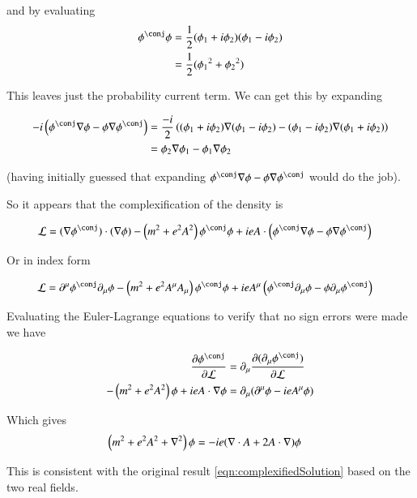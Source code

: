 \documentclass{article}
\begin{document}
and by evaluating
\begin{align*}
\phi^\conj \phi 
&= \inv{2} (\phi_1 + i \phi_2) (\phi_1 - i \phi_2) \\
&= \inv{2} ({\phi_1}^2 + {\phi_2}^2 )
\end{align*}

This leaves just the probability current term.  We can get this by expanding

\begin{align*}
- i \left( \phi^\conj \grad \phi - \phi \grad \phi^\conj \right)
&=
\frac{-i}{2} \left( (\phi_1 + i \phi_2) \grad (\phi_1 - i \phi_2) - (\phi_1 - i \phi_2) \grad (\phi_1 + i \phi_2) \right) \\
&=
\phi_2 \grad \phi_1 - \phi_1 \grad \phi_2
\end{align*}

(having initially guessed that expanding $\phi^\conj \grad \phi - \phi \grad \phi^\conj$ would do the job).

So it appears that the complexification of the density is

\begin{align}
\LL 
&=
(\grad \phi^\conj) \cdot (\grad \phi)
- \left( m^2 + e^2 A^2 \right) \phi^\conj \phi
+ i e A \cdot \left( \phi^\conj \grad \phi - \phi \grad \phi^\conj \right)
\end{align}

Or in index form

\begin{align}
\LL 
&=
\partial^\mu \phi^\conj \partial_\mu \phi
- \left( m^2 + e^2 A^\mu A_\mu \right) \phi^\conj \phi
+ i e A^\mu \left( \phi^\conj \partial_\mu \phi - \phi \partial_\mu \phi^\conj \right)
\end{align}

Evaluating the Euler-Lagrange equations to verify that no sign errors were made we have

\begin{align*}
\PD{\phi^\conj}{\LL}
&=
\partial_\mu \PD{(\partial_\mu \phi^\conj)}{\LL} \\
- \left( m^2 + e^2 A^2 \right) \phi 
+ i e A \cdot \grad \phi
&=
\partial_\mu (\partial^\mu \phi - i e A^\mu \phi) \\
\end{align*}

Which gives
\begin{align}
\left( m^2 + e^2 A^2 + \nabla^2 \right) \phi &= - i e (\nabla \cdot A + 2 A \cdot \nabla) \phi
\end{align}

This is consistent with the original result \ref{eqn:complexifiedSolution} based on the two real fields.



\end{document}
